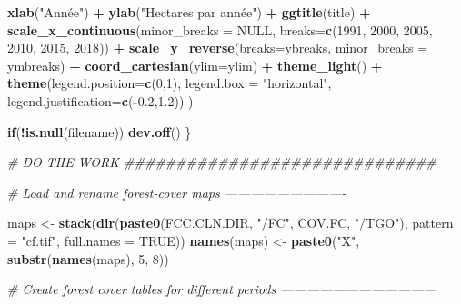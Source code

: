 \documentclass[a4paper, notitlepage, 12pt, krantz2]{krantz}
\newenvironment{Shaded}{\begin{snugshade}}{\end{snugshade}}
\newcommand{\CommentTok}[1]{\textcolor[rgb]{0.56,0.35,0.01}{\textit{#1}}}
\newcommand{\ControlFlowTok}[1]{\textcolor[rgb]{0.13,0.29,0.53}{\textbf{#1}}}
\newcommand{\DataTypeTok}[1]{\textcolor[rgb]{0.13,0.29,0.53}{#1}}
\newcommand{\DecValTok}[1]{\textcolor[rgb]{0.00,0.00,0.81}{#1}}
\newcommand{\FloatTok}[1]{\textcolor[rgb]{0.00,0.00,0.81}{#1}}
\newcommand{\KeywordTok}[1]{\textcolor[rgb]{0.13,0.29,0.53}{\textbf{#1}}}
\newcommand{\NormalTok}[1]{#1}
\newcommand{\OperatorTok}[1]{\textcolor[rgb]{0.81,0.36,0.00}{\textbf{#1}}}
\newcommand{\OtherTok}[1]{\textcolor[rgb]{0.56,0.35,0.01}{#1}}
\newcommand{\StringTok}[1]{\textcolor[rgb]{0.31,0.60,0.02}{#1}}
\begin{document}
\begin{Shaded}
\begin{Highlighting}[]
{{{{{\StringTok{      }\KeywordTok{xlab}\NormalTok{(}\StringTok{"Année"}\NormalTok{) }\OperatorTok{+}\StringTok{ }\KeywordTok{ylab}\NormalTok{(}\StringTok{"Hectares par année"}\NormalTok{) }\OperatorTok{+}\StringTok{ }\KeywordTok{ggtitle}\NormalTok{(title) }\OperatorTok{+}
\StringTok{      }\KeywordTok{scale_x_continuous}\NormalTok{(}\DataTypeTok{minor_breaks =} \OtherTok{NULL}\NormalTok{, }\DataTypeTok{breaks=}\KeywordTok{c}\NormalTok{(}\DecValTok{1991}\NormalTok{, }\DecValTok{2000}\NormalTok{, }\DecValTok{2005}\NormalTok{, }\DecValTok{2010}\NormalTok{, }\DecValTok{2015}\NormalTok{, }\DecValTok{2018}\NormalTok{)) }\OperatorTok{+}\StringTok{ }
\StringTok{      }\KeywordTok{scale_y_reverse}\NormalTok{(}\DataTypeTok{breaks=}\NormalTok{ybreaks, }\DataTypeTok{minor_breaks =}\NormalTok{ ymbreaks) }\OperatorTok{+}\StringTok{ }\KeywordTok{coord_cartesian}\NormalTok{(}\DataTypeTok{ylim=}\NormalTok{ylim) }\OperatorTok{+}\StringTok{ }
\StringTok{      }\KeywordTok{theme_light}\NormalTok{() }\OperatorTok{+}\StringTok{ }\KeywordTok{theme}\NormalTok{(}\DataTypeTok{legend.position=}\KeywordTok{c}\NormalTok{(}\DecValTok{0}\NormalTok{,}\DecValTok{1}\NormalTok{), }\DataTypeTok{legend.box =} \StringTok{"horizontal"}\NormalTok{, }\DataTypeTok{legend.justification=}\KeywordTok{c}\NormalTok{(}\OperatorTok{-}\FloatTok{0.2}\NormalTok{,}\FloatTok{1.2}\NormalTok{))  }
\NormalTok{  )}
  
  \ControlFlowTok{if}\NormalTok{(}\OperatorTok{!}\KeywordTok{is.null}\NormalTok{(filename)) }\KeywordTok{dev.off}\NormalTok{()}
\NormalTok{\}}



\CommentTok{# DO THE WORK ##############################}

\CommentTok{# Load and rename forest-cover maps ----------------------------}

\NormalTok{maps <-}\StringTok{ }\KeywordTok{stack}\NormalTok{(}\KeywordTok{dir}\NormalTok{(}\KeywordTok{paste0}\NormalTok{(FCC.CLN.DIR, }\StringTok{"/FC"}\NormalTok{, COV.FC, }\StringTok{"/TGO"}\NormalTok{), }\DataTypeTok{pattern =} \StringTok{"cf.tif"}\NormalTok{, }\DataTypeTok{full.names =} \OtherTok{TRUE}\NormalTok{))}
\KeywordTok{names}\NormalTok{(maps) <-}\StringTok{ }\KeywordTok{paste0}\NormalTok{(}\StringTok{"X"}\NormalTok{, }\KeywordTok{substr}\NormalTok{(}\KeywordTok{names}\NormalTok{(maps), }\DecValTok{5}\NormalTok{, }\DecValTok{8}\NormalTok{))}

\CommentTok{# Create forest cover tables for different periods ------------------------------------}

}}}}}
\end{Highlighting}
\end{Shaded}
\end{document}
